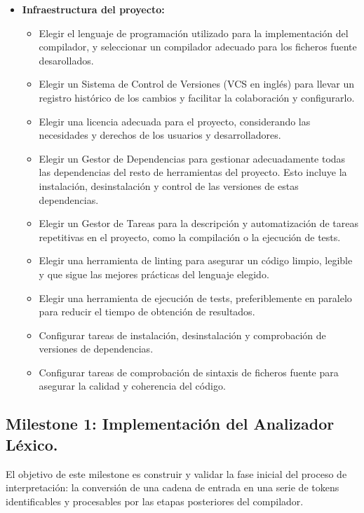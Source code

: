 \begin{itemize}
    \item \textbf{Infraestructura del proyecto:}
    \begin{itemize}
        \item Elegir el lenguaje de programación utilizado para la implementación del compilador, y seleccionar un compilador adecuado para los ficheros fuente desarollados.
        \item Elegir un Sistema de Control de Versiones (VCS en inglés) para llevar un registro histórico de los cambios y facilitar la colaboración y configurarlo.
        \item Elegir una licencia adecuada para el proyecto, considerando las necesidades y derechos de los usuarios y desarrolladores.
        \item Elegir un Gestor de Dependencias para gestionar adecuadamente todas las dependencias del resto de herramientas del proyecto. Esto incluye la instalación, desinstalación y control de las versiones de estas dependencias.
        \item Elegir un Gestor de Tareas para la descripción y automatización de tareas repetitivas en el proyecto, como la compilación o la ejecución de tests.
        \item Elegir una herramienta de linting para asegurar un código limpio, legible y que sigue las mejores prácticas del lenguaje elegido.
        \item Elegir una herramienta de ejecución de tests, preferiblemente en paralelo para reducir el tiempo de obtención de resultados.
        \item Configurar tareas de instalación, desinstalación y comprobación de versiones de dependencias.
        \item Configurar tareas de comprobación de sintaxis de ficheros fuente para asegurar la calidad y coherencia del código.
    \end{itemize}
\end{itemize}

\subsection{Milestone 1: Implementación del Analizador Léxico.}
El objetivo de este milestone es construir y validar la fase inicial del proceso de interpretación: la conversión de una cadena de entrada en una serie de tokens identificables y procesables por las etapas posteriores del compilador.

